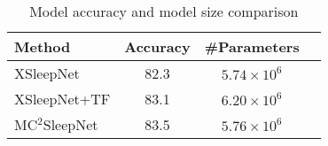 \begin{table}[h]
\centering
\caption{Model accuracy and model size comparison}
\label{table3}
\begin{tabular}{lccc}
\hline
\textbf{Method} & \textbf{Accuracy} & \textbf{\#Parameters} \\
\hline
XSleepNet & 82.3 & $5.74 \times 10^6$  \\
XSleepNet+TF & 83.1 & $6.20 \times 10^6$\\
MC$^2$SleepNet & 83.5 & $5.76 \times 10^6$  \\
\hline
\end{tabular}
\end{table}